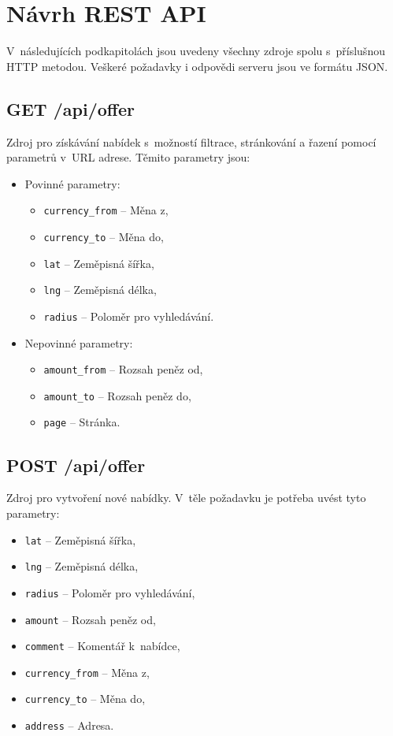 \pagebreak
\section{Návrh REST API}\label{rest-api-design}
V~následujících podkapitolách jsou uvedeny všechny zdroje spolu s~příslušnou HTTP metodou. Veškeré požadavky i odpovědi serveru jsou ve formátu JSON.

\subsection{GET /api/offer}
Zdroj pro získávání nabídek s~možností filtrace, stránkování a řazení pomocí parametrů v~URL adrese. Těmito parametry jsou:
\begin{itemize}
    \item Povinné parametry:
    \begin{itemize}
        \item \texttt{currency\_from} -- Měna z,
        \item \texttt{currency\_to} -- Měna do,
        \item \texttt{lat} -- Zeměpisná šířka,
        \item \texttt{lng} -- Zeměpisná délka,
        \item \texttt{radius} -- Poloměr pro vyhledávání.
    \end{itemize}
    \item Nepovinné parametry:
    \begin{itemize}
        \item \texttt{amount\_from} -- Rozsah peněz od,
        \item \texttt{amount\_to} -- Rozsah peněz do,
        \item \texttt{page} -- Stránka.
    \end{itemize}
\end{itemize}

\subsection{POST /api/offer}
Zdroj pro vytvoření nové nabídky. V~těle požadavku je potřeba uvést tyto parametry:
\begin{itemize}
    \item \texttt{lat} -- Zeměpisná šířka,
    \item \texttt{lng} -- Zeměpisná délka,
    \item \texttt{radius} -- Poloměr pro vyhledávání,
    \item \texttt{amount} -- Rozsah peněz od,
    \item \texttt{comment} -- Komentář k~nabídce,
    \item \texttt{currency\_from} -- Měna z,
    \item \texttt{currency\_to} -- Měna do,
    \item \texttt{address} -- Adresa.
\end{itemize}

